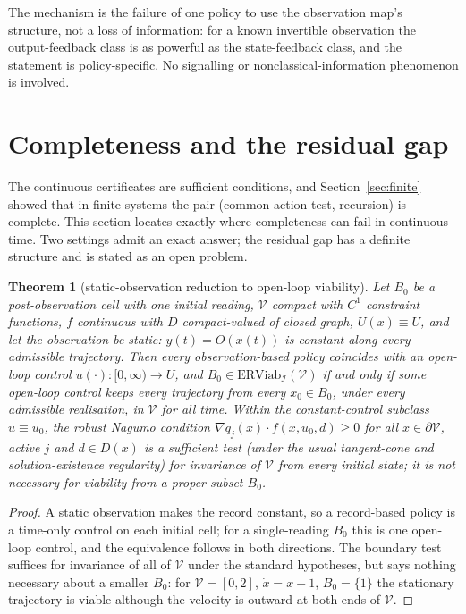 \documentclass[11pt,a4paper]{article}
\theoremstyle{plain}
\newtheorem{theorem}{Theorem}[section]
\theoremstyle{definition}
\theoremstyle{remark}
\newcommand{\ERViab}{\mathrm{ERViab}}
\newcommand{\cV}{\mathcal{V}}
\newcommand{\cI}{\mathcal{I}}
\begin{document}
The mechanism is the failure of one policy to use the observation map's structure, not a loss of information: for a known invertible observation the output-feedback class is as powerful as the state-feedback class, and the statement is policy-specific. No signalling or nonclassical-information phenomenon \citep{witsenhausen1968} is involved.
\section{Completeness and the residual gap}\label{sec:completeness}

The continuous certificates are sufficient conditions, and Section~\ref{sec:finite} showed that in finite systems the pair (common-action test, recursion) is complete. This section locates exactly where completeness can fail in continuous time. Two settings admit an exact answer; the residual gap has a definite structure and is stated as an open problem.

\begin{theorem}[static-observation reduction to open-loop viability]\label{thm:static}
Let $B_0$ be a post-observation cell with one initial reading, $\cV$ compact with $C^1$ constraint functions, $f$ continuous with $D$ compact-valued of closed graph, $U(x)\equiv U$, and let the observation be \emph{static}: $y(t)=O(x(t))$ is constant along every admissible trajectory. Then every observation-based policy coincides with an open-loop control $u(\cdot):[0,\infty)\to U$, and $B_0\in\ERViab_\cI(\cV)$ if and only if some open-loop control keeps every trajectory from every $x_0\in B_0$, under every admissible realisation, in $\cV$ for all time. Within the constant-control subclass $u\equiv u_0$, the robust Nagumo condition \citep{nagumo1942} $\nabla q_j(x)\cdot f(x,u_0,d)\ge0$ for all $x\in\partial\cV$, active $j$ and $d\in D(x)$ is a sufficient test (under the usual tangent-cone and solution-existence regularity) for invariance of $\cV$ from \emph{every} initial state; it is not necessary for viability from a proper subset $B_0$.
\end{theorem}

\begin{proof}
A static observation makes the record constant, so a record-based policy is a time-only control on each initial cell; for a single-reading $B_0$ this is one open-loop control, and the equivalence follows in both directions. The boundary test suffices for invariance of all of $\cV$ under the standard hypotheses, but says nothing necessary about a smaller $B_0$: for $\cV=[0,2]$, $\dot x=x-1$, $B_0=\{1\}$ the stationary trajectory is viable although the velocity is outward at both ends of $\cV$.
\end{proof}
\end{document}
